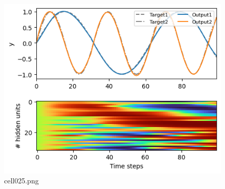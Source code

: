 \begin{figure}[ht]
	\centering
	\includegraphics[scale=0.8, max width=\linewidth]{./fig/solve-credit-assignment-problem/bptt/cell025.png}
	\caption{cell025.png}
	\label{cell025.png}
\end{figure}